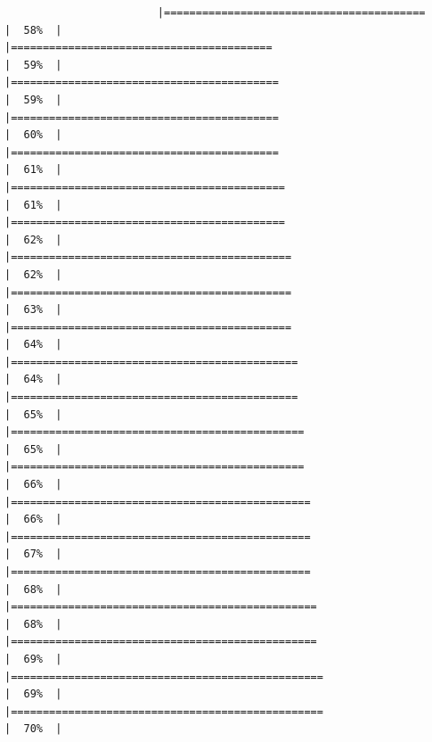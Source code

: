 \documentclass[
  ignorenonframetext,
]{beamer}
\begin{document}
\begin{frame}[fragile]{}
\begin{verbatim}
                        |=========================================                             |  58%  |                                                                              |=========================================                             |  59%  |                                                                              |==========================================                            |  59%  |                                                                              |==========================================                            |  60%  |                                                                              |==========================================                            |  61%  |                                                                              |===========================================                           |  61%  |                                                                              |===========================================                           |  62%  |                                                                              |============================================                          |  62%  |                                                                              |============================================                          |  63%  |                                                                              |============================================                          |  64%  |                                                                              |=============================================                         |  64%  |                                                                              |=============================================                         |  65%  |                                                                              |==============================================                        |  65%  |                                                                              |==============================================                        |  66%  |                                                                              |===============================================                       |  66%  |                                                                              |===============================================                       |  67%  |                                                                              |===============================================                       |  68%  |                                                                              |================================================                      |  68%  |                                                                              |================================================                      |  69%  |                                                                              |=================================================                     |  69%  |                                                                              |=================================================                     |  70%  |                              
\end{verbatim}
\end{frame}
\end{document}
